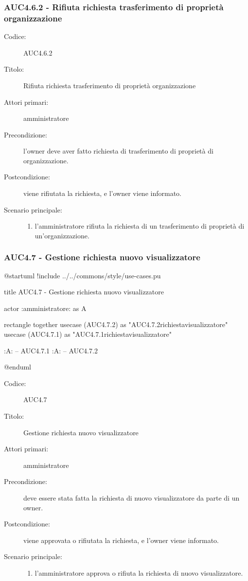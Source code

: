 \documentclass[casi-duso]{subfiles}
\begin{document}
\subsubsection{AUC4.6.2 - Rifiuta richiesta trasferimento di proprietà organizzazione}%
\label{subsub:AUC4.6.2}
\begin{description}
  \item[Codice:] AUC4.6.2
  \item[Titolo:] Rifiuta richiesta trasferimento di proprietà organizzazione
  \item[Attori primari:] amministratore
  \item[Precondizione:] l'owner deve aver fatto richiesta di trasferimento di proprietà di organizzazione.
  \item[Postcondizione:] viene rifiutata la richiesta, e l'owner viene informato.
  \item[Scenario principale:]
  \begin{enumerate}
    \item  l'amministratore rifiuta la richiesta di un trasferimento di proprietà di un'organizzazione.
  \end{enumerate}
\end{description}

\subsubsection{AUC4.7 - Gestione richiesta nuovo visualizzatore}%
\label{subsub:AUC4.7}

\begin{plantuml}
@startuml
!include ../../commons/style/use-cases.pu

title AUC4.7 - Gestione richiesta nuovo visualizzatore

actor :amministratore: as A

rectangle {
  together {
    usecase (AUC4.7.2) as "AUC4.7.2\nRifiuta richiesta\nnuovo visualizzatore"
    usecase (AUC4.7.1) as "AUC4.7.1\nAccetta richiesta\nnuovo visualizzatore"
  }
}

:A: -- AUC4.7.1
:A: -- AUC4.7.2

@enduml
\end{plantuml}

\begin{description}
  \item[Codice:] AUC4.7
  \item[Titolo:] Gestione richiesta nuovo visualizzatore
  \item[Attori primari:] amministratore
  \item[Precondizione:] deve essere stata fatta la richiesta di nuovo visualizzatore da parte di un owner.
  \item[Postcondizione:] viene approvata o rifiutata la richiesta, e l'owner viene informato.
  \item[Scenario principale:]
  \begin{enumerate}
    \item l'amministratore approva o rifiuta la richiesta di nuovo visualizzatore.
  \end{enumerate}
\end{description}
\end{document}
